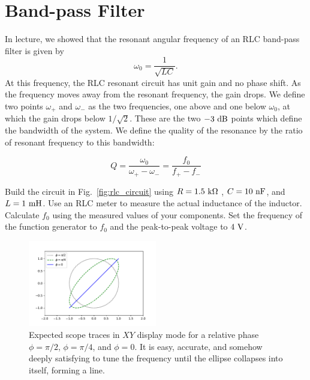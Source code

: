 \section{Band-pass Filter}

In lecture, we showed that the resonant angular frequency of an RLC
band-pass filter is given by
\begin{equation}
\omega_0 = \frac{1}{\sqrt{LC}}. 
\end{equation}
At this frequency, the RLC resonant circuit has unit gain and no phase
shift.  As the frequency moves away from the resonant frequency, the
gain drops.  We define two points $\omega_+$ and $\omega_-$ as the two
frequencies, one above and one below $\omega_0$, at which the gain
drops below $1/\sqrt{2}$.  These are the two $-3~\rm dB$ points which
define the bandwidth of the system.  We define the quality of the
resonance by the ratio of resonant frequency to this bandwidth:

\begin{displaymath}
Q = \frac{\omega_0}{\omega_+ - \omega_-} = \frac{f_0}{f_+-f_-}
\end{displaymath}


Build the circuit in Fig.~\ref{fig:rlc_circuit} using $R=1.5~{\rm k \Omega}$ ,
$C=10~\rm{n F}$, and $L=1~\rm mH$.  Use an RLC meter to measure the actual inductance of the inductor.
Calculate $f_0$ using the measured values of your components.  Set the frequency of the
function generator to $f_0$ and the peak-to-peak
voltage to $4~\rm V$.

\begin{figure}[htbp]
\begin{center}
\includegraphics[width=0.50\textwidth]{figs/labs/filters/scope_xy.pdf}
\end{center}
\caption{\label{fig:scopexy} 
Expected scope traces in $XY$ display mode for a relative phase $\phi=\pi/2$, 
$\phi=\pi/4$, and $\phi=0$.  It is easy, accurate, and somehow deeply satisfying to tune the frequency until the ellipse collapses into itself, forming a line.}
\end{figure}

